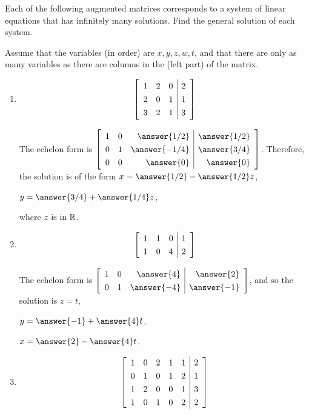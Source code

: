 \documentclass{ximera}
\author{Zack Reed}
\begin{document}
\begin{exercise}

    Each of the following augmented matrices corresponds to a system of linear equations that has infinitely many solutions. Find the general solution of each system.

    Assume that the variables (in order) are $x, y, z, w, t$, and that there are only as many variables as there are columns in the (left part) of the matrix.

    \begin{enumerate}

        \item 
        \begin{equation*}    
            \startmat{rrr|r}
              1 & 2 & 0 & 2 \\
              2 & 0 & 1 & 1 \\
              3 & 2 & 1 & 3
            \stopmat
        \end{equation*}

        The echelon form is
        $\def\arraystretch{1.3}
        \startmat{rrr|r}
          1 & 0 & \answer{1/2} & \answer{1/2} \\
          0 & 1 & \answer{-1/4} & \answer{3/4} \\
          0 & 0 & \answer{0} & \answer{0}
        \stopmat$. Therefore, the solution is of the form $x=\answer{1/2}-\answer{1/2}z$, 
        
        $y=\answer{3/4}+\answer{1/4}z$, 
        
        where $z\text{ is in } \mathbb{R}$.

        \item 
        \begin{equation*}
            \startmat{rrr|r}
              1 & 1 & 0 & 1 \\
              1 & 0 & 4 & 2
            \stopmat
        \end{equation*}

        The echelon form is 
        $\startmat{rrr|r}
          1 & 0 & \answer{4} & \answer{2} \\
          0 & 1 & \answer{-4} & \answer{-1}
        \stopmat$, and so the solution is $z=t$, 
        
        $y=\answer{-1}+\answer{4}t$, 
        
        $x=\answer{2}-\answer{4}t$.


        \item 
        \begin{equation*}
            \startmat{rrrrr|r}
              1 & 0 & 2 & 1 & 1 & 2 \\
              0 & 1 & 0 & 1 & 2 & 1 \\
              1 & 2 & 0 & 0 & 1 & 3 \\
              1 & 0 & 1 & 0 & 2 & 2
            \stopmat
        \end{equation*}


\end{enumerate}
\end{exercise}
\end{document}

